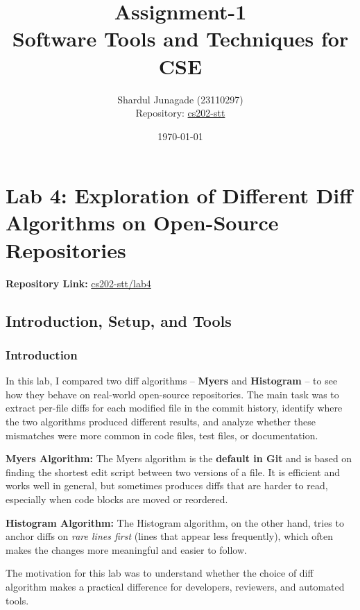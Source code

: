 \documentclass[10pt,a4paper]{report}
\title{\Huge Assignment-1 \\[0.5cm] \LARGE Software Tools and Techniques for CSE}
\author{\Large Shardul Junagade (23110297) \\[0.2cm] \Large Repository: \href{https://github.com/ShardulJunagade/cs202-stt}{cs202-stt}}
\date{\large \today}
\begin{document}
\maketitle
\newpage

\tableofcontents
\newpage


\chapter{Lab 4: Exploration of Different Diff Algorithms on Open-Source Repositories}

\textbf{Repository Link:} \href{https://github.com/ShardulJunagade/cs202-stt/tree/main/lab4}{cs202-stt/lab4}

\section{Introduction, Setup, and Tools}

\subsection{Introduction}
In this lab, I compared two diff algorithms -- \textbf{Myers} and \textbf{Histogram} -- to see how they behave on real-world open-source repositories.  
The main task was to extract per-file diffs for each modified file in the commit history, identify where the two algorithms produced different results, and analyze whether these mismatches were more common in code files, test files, or documentation.  

\textbf{Myers Algorithm:} The Myers algorithm is the \textbf{default in Git} and is based on finding the shortest edit script between two versions of a file. It is efficient and works well in general, but sometimes produces diffs that are harder to read, especially when code blocks are moved or reordered.

\textbf{Histogram Algorithm:} The Histogram algorithm, on the other hand, tries to anchor diffs on \emph{rare lines first} (lines that appear less frequently), which often makes the changes more meaningful and easier to follow.

The motivation for this lab was to understand whether the choice of diff algorithm makes a practical difference for developers, reviewers, and automated tools.  
\end{document}
